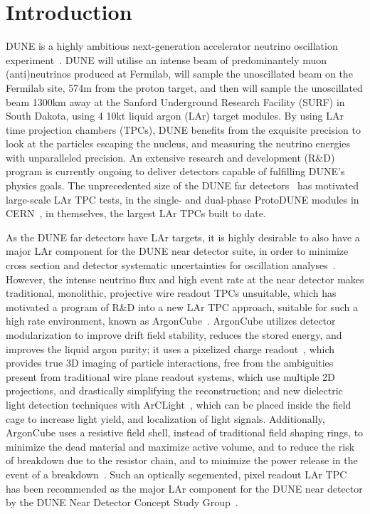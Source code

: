 \section{Introduction}
\label{sec:introduction}

DUNE is a highly ambitious next-generation accelerator neutrino oscillation experiment~\cite{DUNE, DUNE2}. DUNE will utilise an intense beam of predominantely muon (anti)neutrinos produced at Fermilab, will sample the unoscillated beam on the Fermilab site, 574m from the proton target, and then will sample the unoscillated beam 1300km away at the Sanford Underground Research Facility (SURF) in South Dakota, using 4 10kt liquid argon (LAr) target modules. By using LAr time projection chambers (TPCs), DUNE benefits from the exquisite precision to look at the particles escaping the nucleus, and measuring the neutrino energies with unparalleled precision. An extensive research and development (R\&D) program is currently ongoing to deliver detectors capable of fulfilling DUNE's physics goals. The unprecedented size of the DUNE far detectors~\cite{DUNE_IDR_v1, DUNE_IDR_v2, DUNE_IDR_v3} has motivated large-scale LAr TPC tests, in the single- and dual-phase ProtoDUNE modules in CERN~\cite{Abi:2017aow, Agostino:2014qoa}, in themselves, the largest LAr TPCs built to date.

As the DUNE far detectors have LAr targets, it is highly desirable to also have a major LAr component for the DUNE near detector suite, in order to minimize cross section and detector systematic uncertainties for oscillation analyses~\cite{DUNE, DUNE2}. However, the intense neutrino flux and high event rate at the near detector makes traditional, monolithic, projective wire readout TPCs unsuitable, which has motivated a program of R\&D into a new LAr TPC approach, suitable for such a high rate environment, known as ArgonCube~\cite{argoncube_loi}. ArgonCube utilizes detector modularization to improve drift field stability, reduces the stored energy, and improves the liquid argon purity; it uses a pixelized charge readout~\cite{pixels, larpix}, which provides true 3D imaging of particle interactions, free from the ambiguities present from traditional wire plane readout systems, which use multiple 2D projections, and drastically simplifying the reconstruction; and new dielectric light detection techniques with ArCLight~\cite{arclight}, which can be placed inside the field cage to increase light yield, and localization of light signals. Additionally, ArgonCube uses a resistive field shell, instead of traditional field shaping rings, to minimize the dead material and maximize active volume, and to reduce the risk of breakdown due to the resistor chain, and to minimize the power release in the event of a breakdown~\addcite. Such an optically segemented, pixel readout LAr TPC has been recommended as the major LAr component for the DUNE near detector by the DUNE Near Detector Concept Study Group~\cite{dune_ndcsg}.

